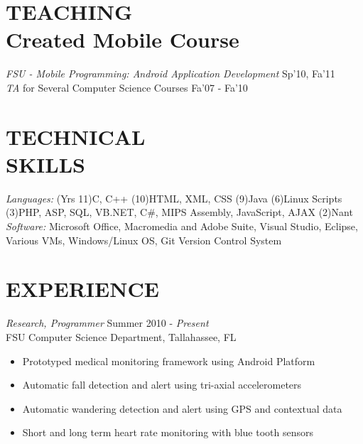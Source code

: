\documentclass[margin]{res}
\begin{document}
\begin{resume}
\section{TEACHING \\ Created Mobile Course} {\sl FSU - Mobile Programming: Android Application Development} \hfill Sp'10, Fa'11\\
{\it TA} for Several Computer Science Courses \hfill Fa'07 - Fa'10



\section{TECHNICAL \\ SKILLS} 

{\sl Languages:}
(Yrs 11)C, C++
(10)HTML, XML, CSS
(9)Java
(6)Linux Scripts 
(3)PHP, ASP, SQL, VB.NET, C\#, MIPS Assembly, JavaScript, AJAX
(2)Nant 
\\{\sl Software:}
Microsoft Office, Macromedia and Adobe Suite,
Visual Studio, Eclipse,
Various VMs,
Windows/Linux OS,
Git Version Control System


\section{EXPERIENCE} 

{\sl Research, Programmer} \hfill            Summer 2010 - \textit{Present} \\
FSU Computer Science Department, Tallahassee, FL
\begin{itemize}  \itemsep -5pt %
\item Prototyped medical monitoring framework using Android Platform
\item Automatic fall detection and alert using tri-axial accelerometers
\item Automatic wandering detection and alert using GPS and contextual data
\item Short and long term heart rate monitoring with blue tooth sensors
\end{itemize} 


\end{resume}
\end{document}
